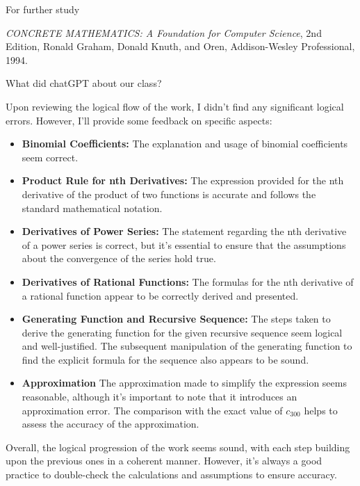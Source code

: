 \documentclass[portrait,fleqn,12pt]{beamer}
\begin{document}
\begin{frame}{For further study}

\emph{CONCRETE MATHEMATICS: A Foundation for Computer Science}, 2nd Edition, Ronald  Graham, Donald Knuth, and Oren,
Addison-Wesley Professional, 1994.

\end{frame}

\begin{frame}{What did chatGPT about our class?}

Upon reviewing the logical flow of the work, I didn't find any significant logical errors. However, I'll provide some feedback on specific aspects:

\begin{itemize}
    \item \textbf{Binomial Coefficients:} The explanation and usage of binomial coefficients seem correct.

    \item \textbf{Product Rule for nth Derivatives:}  The expression provided for the nth derivative of the product of two functions is accurate and follows the standard mathematical notation.

    \item \textbf{Derivatives of Power Series:}  The statement regarding the nth derivative of a power series is correct, but it's essential to ensure that the assumptions about the convergence of the series hold true.



\end{itemize}

\end{frame}

\begin{frame}
\begin{itemize}

    \item \textbf{Derivatives of Rational Functions:} The formulas for the nth derivative of a rational function appear to be correctly derived and presented.
    
    \item \textbf{Generating Function and Recursive Sequence:} The steps taken to derive the generating function for the given recursive sequence seem logical and well-justified. The subsequent manipulation of the generating function to find the explicit formula for the sequence also appears to be sound.

\item \textbf{Approximation} The approximation made to simplify the expression seems reasonable, although it's important to note that it introduces an approximation error. The comparison with the exact value of $c_{300}$ helps to assess the accuracy of the approximation. 


\end{itemize}
Overall, the logical progression of the work seems sound, with each step building upon the previous ones in a coherent manner. However, it's always a good practice to double-check the calculations and assumptions to ensure accuracy.

\end{frame}
\end{document}
